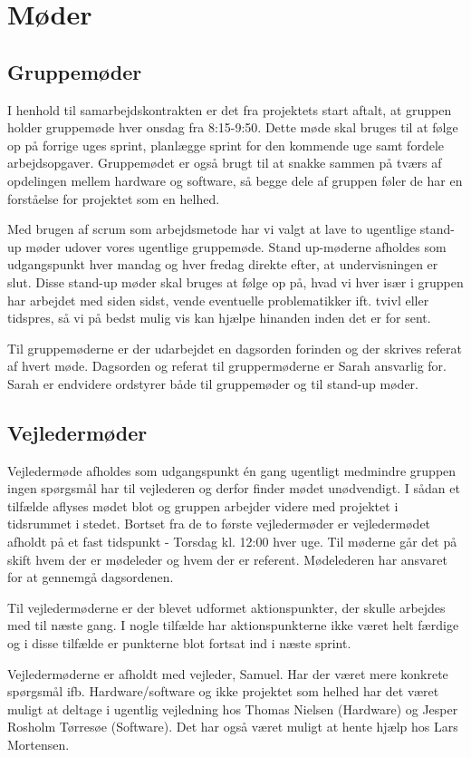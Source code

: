 \section{Møder}
\subsection{Gruppemøder}
I henhold til samarbejdskontrakten er det fra projektets start aftalt, at gruppen holder gruppemøde hver onsdag fra 8:15-9:50. Dette møde skal bruges til at følge op på forrige uges sprint, planlægge sprint for den kommende uge samt fordele arbejdsopgaver. Gruppemødet er også brugt til at snakke sammen på tværs af opdelingen mellem hardware og software, så begge dele af gruppen føler de har en forståelse for projektet som en helhed.

Med brugen af scrum som arbejdsmetode har vi valgt at lave to ugentlige stand-up møder udover vores ugentlige gruppemøde. Stand up-møderne afholdes som udgangspunkt hver mandag og hver fredag direkte efter, at undervisningen er slut. Disse stand-up møder skal  bruges at følge op på, hvad vi hver især i gruppen har arbejdet med siden sidst, vende eventuelle problematikker ift. tvivl eller tidspres, så vi på bedst mulig vis kan hjælpe hinanden inden det er for sent.

Til gruppemøderne er der udarbejdet en dagsorden forinden og der skrives referat af hvert møde. Dagsorden og referat til gruppermøderne er Sarah ansvarlig for. Sarah er endvidere ordstyrer både til gruppemøder og til stand-up møder. 

\subsection{Vejledermøder}
Vejledermøde afholdes som udgangspunkt én gang ugentligt medmindre gruppen ingen spørgsmål har til vejlederen og derfor finder mødet unødvendigt. I sådan et tilfælde aflyses mødet blot og gruppen arbejder videre med projektet i tidsrummet i stedet. Bortset fra de to første vejledermøder er vejledermødet afholdt på et fast tidspunkt - Torsdag kl. 12:00 hver uge. Til møderne går det på skift hvem der er mødeleder og hvem der er referent. Mødelederen har ansvaret for at gennemgå dagsordenen.

Til vejledermøderne er der blevet udformet aktionspunkter, der skulle arbejdes med til næste gang. I nogle tilfælde har aktionspunkterne ikke været helt færdige og i disse tilfælde er punkterne blot fortsat ind i næste sprint. 

Vejledermøderne er afholdt med vejleder, Samuel. Har der været mere konkrete spørgsmål ifb. Hardware/software og ikke projektet som helhed har det været muligt at deltage i ugentlig vejledning hos Thomas Nielsen (Hardware) og Jesper Rosholm Tørresøe (Software). Det har også været muligt at hente hjælp hos Lars Mortensen.

